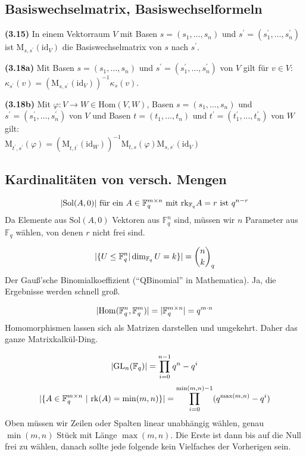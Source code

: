 \documentclass[11pt]{scrartcl}
\newlength{\hangwidth}
\newcommand{\skript}[1]{\settowidth{\hangwidth}{\textbf{(#1)} }\hangpara{\hangwidth}{1}\textbf{(#1)} }%
\newcommand{\id}{\mathrm{id}}%
\newcommand{\Sol}{\mathrm{Sol}}%
\newcommand{\rk}{\mathrm{rk}}%
\newcommand{\GL}{\mathrm{GL}}%
\newcommand{\Field}{\mathbb{F}}%
\DeclarePairedDelimiter\abs{\lvert}{\rvert}%
\begin{document}
\subsection{Basiswechselmatrix, Basiswechselformeln}

\skript{3.15}In einem Vektorraum $V$ mit Basen $s = (s_1,\ldots, s_n)$ und $s^\prime = (s^\prime_1, \ldots, s^\prime_n)$ ist $\mathrm{M}_{s, s^\prime}(\id_V)$ die Basiswechselmatrix von $s$ nach $s^\prime$.

\skript{3.18a}Mit Basen $s = (s_1,\ldots, s_n)$ und $s^\prime = (s^\prime_1, \ldots, s^\prime_n)$ von $V$ gilt für $v \in V$:\\ $\kappa_{s^\prime}(v) = (\mathrm{M}_{s,s^\prime}(\id_V))^{-1} \kappa_s(v)$.

\skript{3.18b}Mit $\varphi : V \to W \in \mathrm{Hom}(V,W)$, Basen $s = (s_1,\ldots, s_n)$ und $s^\prime = (s^\prime_1, \ldots, s^\prime_n)$ von $V$ und Basen $t = (t_1,\ldots, t_n)$ und $t^\prime = (t^\prime_1, \ldots, t^\prime_n)$ von $W$ gilt: \\
$\mathrm{M}_{t^\prime, s^\prime}(\varphi) = (\mathrm{M}_{t,t^\prime}(\id_W))^{-1} \mathrm{M}_{t,s}(\varphi) \mathrm{M}_{s,s^\prime}(\id_V)$

\subsection{Kardinalitäten von versch. Mengen}

$$\abs{\Sol(A,0)} \text{ für ein } A \in \Field_q^{m \times n} \text{ mit } \rk_{\Field_q} A = r \text{ ist } q^{n-r}$$
Da Elemente aus $\Sol(A,0)$ Vektoren aus $\Field_q^n$ sind, müssen wir $n$ Parameter aus $\Field_q$ wählen, von denen $r$ nicht frei sind.

$$\abs{\{ U \leq \Field_q^n | \dim_{\Field_q} U = k \}} = \binom{n}{k}_q$$
Der Gauß'sche Binomialkoeffizient (``QBinomial'' in Mathematica). Ja, die Ergebnisse werden schnell groß.

$$\abs{\mathrm{Hom}(\Field_q^n,\Field_q^m)} = \abs{\Field_q^{m \times n}} = q^{m \cdot n}$$
Homomorphismen lassen sich als Matrizen darstellen und umgekehrt. Daher das ganze Matrixkalkül-Ding.

$$\abs{\GL_n(\Field_q)} = \prod_{i=0}^{n-1} q^n-q^i$$
$$\abs{\{A \in \Field_q^{m \times n} ~ | ~ \rk(A) = \min(m,n)\}} = \prod_{i=0}^{\min(m,n)-1} (q^{\max(m,n)}-q^i)$$
Oben müssen wir Zeilen oder Spalten linear unabhängig wählen, genau $\min(m,n)$ Stück mit Länge $\max(m,n)$. Die Erste ist dann bis auf die Null frei zu wählen, danach sollte jede folgende kein Vielfaches der Vorherigen sein.
\end{document}

